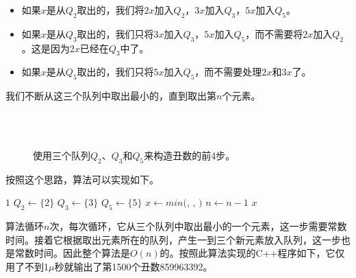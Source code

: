 \documentclass[UTF8]{article}
\begin{document}
\begin{itemize}
\item 如果$x$是从$Q_2$取出的，我们将$2x$加入$Q_2$，$3x$加入$Q_3$，$5x$加入$Q_5$。
\item 如果$x$是从$Q_3$取出的，我们只将$3x$加入$Q_3$，$5x$加入$Q_5$，而不需要将$2x$加入$Q_2$。这是因为$2x$已经在$Q_3$中了。
\item 如果$x$是从$Q_5$取出的，我们只将$5x$加入$Q_5$，而不需要处理$2x$和$3x$了。
\end{itemize}

我们不断从这三个队列中取出最小的，直到取出第$n$个元素。

\begin{figure}[htbp]
  \renewcommand*\thesubfigure{\arabic{subfigure}}
  \centering
   \\
   \\
  \caption{使用三个队列$Q_2$、$Q_3$和$Q_5$来构造丑数的前4步。}
  \label{fig:q235}
\end{figure}

按照这个思路，算法可以实现如下。

\begin{algorithmic}[1]
    \State \Return $1$
  \Else
    \State $Q_2 \gets \{ 2 \}$
    \State $Q_3 \gets \{ 3 \}$
    \State $Q_5 \gets \{ 5 \}$
      \State $x \gets min($, , $)$
        \State {}
        \State {}
        \State {}
        \State {}
        \State {}
        \State {}
        \State {}
      \Else
        \State {}
        \State {}
      \EndIf
      \State $n \gets n - 1$
    \EndWhile
    \State \Return $x$
  \EndIf
\EndFunction
\end{algorithmic}

算法循环$n$次，每次循环，它从三个队列中取出最小的一个元素，这一步需要常数时间。接着它根据取出元素所在的队列，产生一到三个新元素放入队列，这一步也是常数时间。因此整个算法是$O(n)$的。按照此算法实现的C++程序如下，它仅用了不到1$\mu$秒就输出了第1500个丑数859963392。
\end{document}
